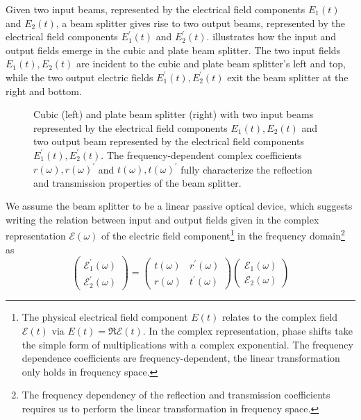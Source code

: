 Given two input beams, represented by the electrical field components $E_1(t)$ and $E_2(t)$, a beam splitter gives rise to two output beams, represented by the electrical field components $E_1^\prime(t)$ and $E_2^\prime(t)$.
 illustrates how the input and output fields emerge in the cubic and plate beam splitter.
The two input fields $E_1(t),E_2(t)$ are incident to the cubic and plate beam splitter's left and top, while the two output electric fields $E_1^\prime(t),E_2^\prime(t)$ exit the beam splitter at the right and bottom.
\begin{figure}[htb]
    \centering
    
    \caption{Cubic (left) and plate beam splitter (right) with two input beams represented by the electrical field components $E_1(t),E_2(t)$ and two output beam represented by the electrical field components $E_1^\prime(t),E_2^\prime(t)$. The frequency-dependent complex coefficients $r(\omega),r(\omega)^\prime$ and $t(\omega),t(\omega)^\prime$ fully characterize the reflection and transmission properties of the beam splitter.}\label{fig:beam_splitter_cube_plate}
\end{figure}
We assume the beam splitter to be a linear passive optical device, which suggests writing the relation between input and output fields given in the complex representation $\mathcal{E}(\omega)$ of the electric field component\footnote{The physical electrical field component $E(t)$ relates to the complex field $\mathcal{E}(t)$ via $E(t)=\Re\mathcal{E}(t)$. In the complex representation, phase shifts take the simple form of multiplications with a complex exponential. The frequency dependence coefficients are frequency-dependent, the linear transformation only holds in frequency space.} in the frequency domain\footnote{The frequency dependency of the reflection and transmission coefficients requires us to perform the linear transformation in frequency space.} as
\begin{equation}
    \begin{pmatrix}
        \mathcal{E}_1^\prime(\omega)
        \\
        \mathcal{E}_2^\prime(\omega)
    \end{pmatrix}
    =
    \begin{pmatrix}
        t(\omega) & r^\prime(\omega)
        \\
        r(\omega) & t^\prime(\omega)
    \end{pmatrix}
    \begin{pmatrix}
        \mathcal{E}_1(\omega)
        \\
        \mathcal{E}_2(\omega)
    \end{pmatrix}
    \label{eq:beam_splitter_coefficients_transform}
\end{equation}
